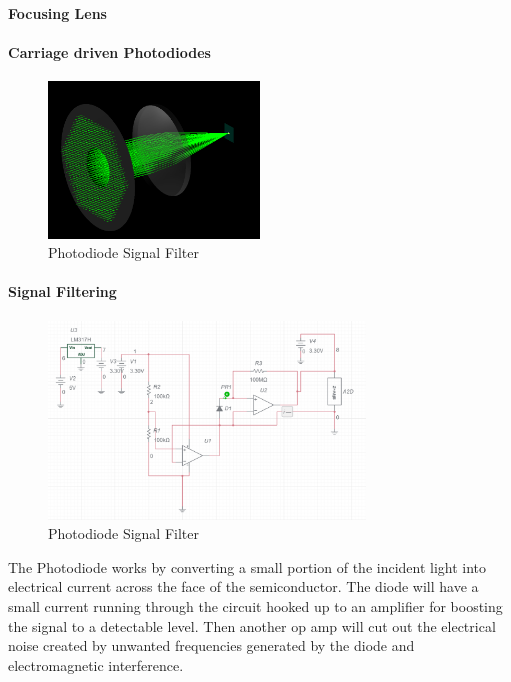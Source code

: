\paragraph{Focusing Lens}

\paragraph{Carriage driven Photodiodes}

\begin{figure}[H]
    \caption{Photodiode Signal Filter}
    \centering
    \includegraphics[width=0.5\textwidth]{images/ColimatedBeam.png}
\end{figure}

\paragraph{Signal Filtering}

\begin{figure}[H]
    \caption{Photodiode Signal Filter}
    \centering
    \includegraphics[width=0.75\textwidth]{images/ElectricalSignalFilteringSD1.png}
\end{figure}


The Photodiode works by converting a small portion of the incident light into electrical current across the face of the semiconductor. The diode will have a small current running through the circuit hooked up to an amplifier for boosting the signal to a detectable level. Then another op amp will cut out the electrical noise created by unwanted frequencies generated by the diode and electromagnetic interference.

